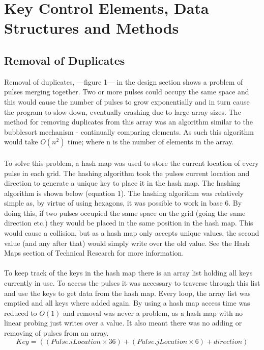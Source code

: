 \documentclass[10pt,a4paper]{article}
\begin{document}
\section{Key Control Elements, Data Structures and Methods}
\subsection{Removal of Duplicates}
Removal of duplicates, ---figure 1--- in the design section shows a problem of pulses merging together. Two or more pulses could occupy the same space and this would cause the number of pulses to grow exponentially and in turn cause the program to slow down, eventually crashing due to large array sizes. The method for removing duplicates from this array was an algorithm similar to the bubblesort mechanism - continually comparing elements. As such this algorithm would take $ O(n^{2}) $ time; where n is the number of elements in the array. \\
\\
To solve this problem, a hash map was used to store the current location of every pulse in each grid. The hashing algorithm took the pulses current location and direction to generate a unique key to place it in the hash map. The hashing algorithm is shown below (equation 1). The hashing algorithm was relatively simple as, by virtue of using hexagons, it was possible to work in base 6. By doing this, if two pulses occupied the same space on the grid (going the same direction etc.) they would be placed in the same position in the hash map. This would cause a collision, but as a hash map only accepts unique values, the second value (and any after that) would simply write over the old value. See the Hash Maps section of Technical Research for more information.\\
\\
To keep track of the keys in the hash map there is an array list holding all keys currently in use. To access the pulses it was necessary to traverse through this list and use the keys to get data from the hash map. Every loop, the array list was emptied and all keys where added again. By using a hash map access time was reduced to $O(1)$ and removal was never a problem, as a hash map with no linear probing just writes over a value. It also meant there was no adding or removing of pulses from an array.\\
\begin{equation}
Key = ((Pulse.iLocation \times 36) + (Pulse.jLocation \times 6) + direction)
\end{equation}
\end{document}
